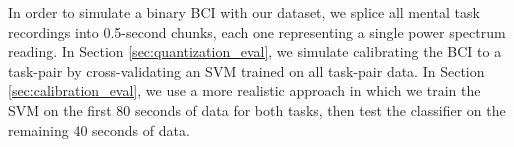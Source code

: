 
In order to simulate a binary BCI with our dataset, we splice all mental task recordings into 0.5-second chunks, each one representing a single power spectrum reading. In Section \ref{sec:quantization_eval}, we simulate calibrating the BCI to a task-pair by cross-validating an SVM trained on all task-pair data. In Section \ref{sec:calibration_eval}, we use a more realistic approach in which we train the SVM on the first 80 seconds of data for both tasks, then test the classifier on the remaining 40 seconds of data.







